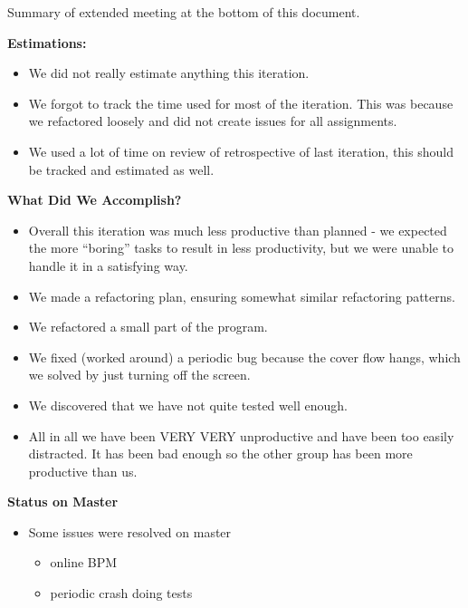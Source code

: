 Summary of extended meeting at the bottom of this document.

\textbf{Estimations:}
\begin{itemize}
\item We did not really estimate anything this iteration.
\item We forgot to track the time used for most of the iteration. This was because we refactored loosely and did not create issues for all assignments.
\item We used a lot of time on review of retrospective of last iteration, this should be tracked and estimated as well.
\end{itemize}


\textbf{What Did We Accomplish?}
\begin{itemize}
\item Overall this iteration was much less productive than planned - we expected the more “boring” tasks to result in less productivity, but we were unable to handle it in a satisfying way.
\item We made a refactoring plan, ensuring somewhat similar refactoring patterns.
\item We refactored a small part of the program.
\item We fixed (worked around) a periodic bug because the cover flow hangs, which we solved by just turning off the screen.
\item We discovered that we have not quite tested well enough.
\item All in all we have been VERY VERY unproductive and have been too easily distracted. It has been bad enough so the other group has been more productive than us. 
\end{itemize}


\textbf{Status on Master}
\begin{itemize}
\item Some issues were resolved on master
\begin{itemize}
\item online BPM
\item periodic crash doing tests
\end{itemize}
\end{itemize}

